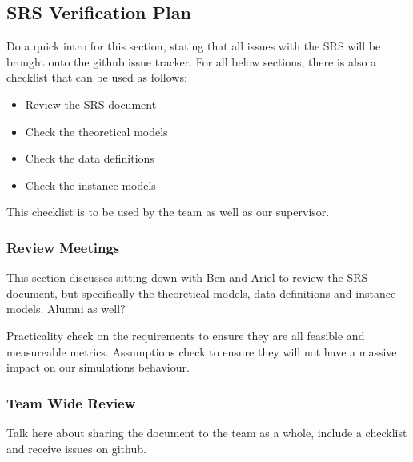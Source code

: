 \documentclass[12pt, titlepage]{article}
\begin{document}
\subsection{SRS Verification Plan}




Do a quick intro for this section, stating that all issues with the SRS will be brought onto the github issue tracker. 
For all below sections, there is also a checklist that can be used as follows:
\begin{itemize}
  \item Review the SRS document
  \item Check the theoretical models
  \item Check the data definitions
  \item Check the instance models
\end{itemize}
This checklist is to be used by the team as well as our supervisor.

\subsubsection*{Review Meetings}
This section discusses sitting down with Ben and Ariel to review the SRS document, but specifically the theoretical models, data definitions and instance models. Alumni as well?

Practicality check on the requirements to ensure they are all feasible and measureable metrics. Assumptions check to ensure they will not have a massive impact on our simulations behaviour.

\subsubsection*{Team Wide Review}
Talk here about sharing the document to the team as a whole, include a checklist and receive issues on github.
\end{document}
